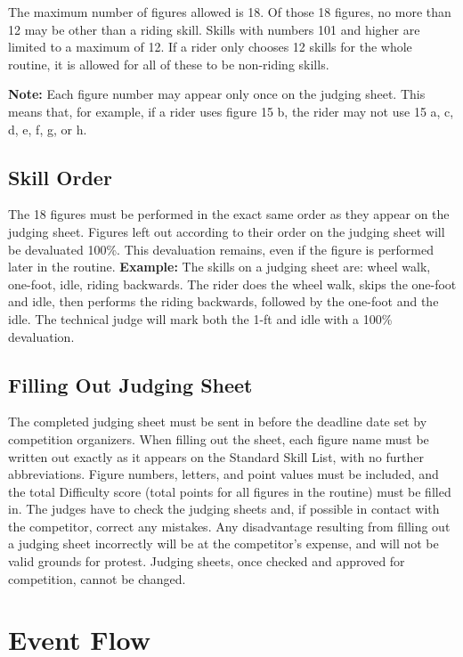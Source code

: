 The maximum number of figures allowed is 18.
Of those 18 figures, no more than 12 may be other than a riding skill.
Skills with numbers 101 and higher are limited to a maximum of 12.
If a rider only chooses 12 skills for the whole routine, it is allowed for all of these to be non-riding skills.

\textbf{Note:} Each figure number may appear only once on the judging sheet.
This means that, for example, if a rider uses figure 15 b, the rider may not use 15 a, c, d, e, f, g, or h.

\subsection{Skill Order}
The 18 figures must be performed in the exact same order as they appear on the judging sheet.
Figures left out according to their order on the judging sheet will be devaluated 100\%.
This devaluation remains, even if the figure is performed later in the routine.
\textbf{Example:} The skills on a judging sheet are: wheel walk, one-foot, idle, riding backwards.
The rider does the wheel walk, skips the one-foot and idle, then performs the riding backwards, followed by the one-foot and the idle.
The technical judge will mark both the 1-ft and idle with a 100\% devaluation.

\subsection{Filling Out Judging Sheet}
The completed judging sheet must be sent in before the deadline date set by competition organizers.
When filling out the sheet, each figure name must be written out exactly as it appears on the Standard Skill List, with no further abbreviations.
Figure numbers, letters, and point values must be included, and the total Difficulty score (total points for all figures in the routine) must be filled in.
The judges have to check the judging sheets and, if possible in contact with the competitor, correct any mistakes.
Any disadvantage resulting from filling out a judging sheet incorrectly will be at the competitor's expense, and will not be valid grounds for protest.
Judging sheets, once checked and approved for competition, cannot be changed.

\section{Event Flow}

